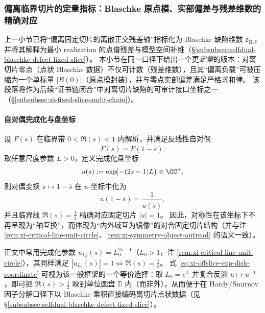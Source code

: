 \subsubsection{偏离临界切片的定量指标：Blaschke 原点模、实部偏差与残差维数的精确对应}\label{subsubsec:xi-offslice-quantitative-indicators}
上一小节已将“偏离固定切片的离散正交残差轴”指标化为 Blaschke 缺陷维数 \(\mathfrak d_{\mathrm{Bl}}\)，并将其解释为最小 realization 的点谱残差与模型空间补维（\S\ref{subsubsec:selfdual-blaschke-defect-fixed-slice}）。
本小节在同一口径下给出一个更\emph{定量}的版本：对离切片零点（点状 Blaschke 数据）不仅可计数（残差维数），且其“偏离负载”可被压缩为一个单标量 \(|B(0)|\)（原点模封装），并与零点实部偏差满足严格求和律。
该段落将作为后续“证书链闭合”中对离切片缺陷的可审计接口坐标之一（\S\ref{subsubsec:xi-fixed-slice-audit-chain}）。

\paragraph{自对偶完成化与盘坐标}
设 \(F(s)\) 在临界带 \(0<\Re(s)<1\) 内解析，并满足反线性自对偶
\begin{equation}\label{eq:xi-offslice-selfdual-on-strip}
F(s)=\overline{F(1-\overline s)}.
\end{equation}
取任意尺度参数 \(L>0\)，定义完成化盘坐标
\begin{equation}\label{eq:xi-offslice-exp-disk-coordinate}
u(s):=\exp\!\bigl(-(2s-1)L\bigr)\in\CC^\times.
\end{equation}
则对偶变换 \(s\mapsto 1-\overline s\) 在 \(u\)-坐标中化为
\begin{equation}\label{eq:xi-offslice-exp-disk-duality}
u(1-\overline s)=\frac{1}{\overline{u(s)}},
\end{equation}
并且临界线 \(\Re(s)=\tfrac12\) 精确对应固定切片 \(|u|=1\)。
因此，对称性在该坐标下不再呈现为“轴互换”，而体现为“内外域互为镜像”的对合固定切片结构（并与注 \ref{rem:xi-critical-line-unit-circle}、\ref{rem:xi-symmetry-object-autread} 的语义一致）。

\begin{remark}\label{rem:xi-offslice-exp-vs-dirichlet}
正文中常用完成化参数 \(u_{L_0}(s)=L_0^{2s-1}\)（\(L_0>1\)，注 \ref{rem:xi-critical-line-unit-circle}），其同样满足 \(|u_{L_0}(s)|=1\iff \Re(s)=\tfrac12\)。
式 \eqref{eq:xi-offslice-exp-disk-coordinate} 可视为该一般框架的一个等价选择：取 \(L_0=e^{L}\) 并复合反演 \(u\mapsto u^{-1}\)，即可把 \(\Re(s)>\tfrac12\) 映到单位圆盘 \(\mathbb{D}\) 内（而非外），从而便于在 Hardy/Smirnov 因子分解口径下以 Blaschke 乘积直接编码离切片点状数据（见 \S\ref{subsubsec:selfdual-blaschke-defect-fixed-slice}）。
\end{remark}

